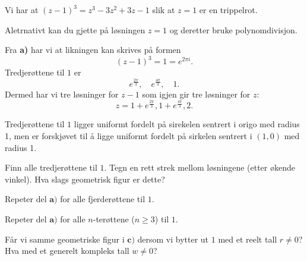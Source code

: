 \begin{losning}

\begin{punkt}
Vi har at $(z-1)^3=z^3-3z^2+3z-1$ slik at $z=1$ er en trippelrot.

\noindent
Aletrnativt kan du gjette på løsningen $z=1$ og deretter bruke polynomdivisjon.
\end{punkt}

\begin{punkt}


Fra \textbf{a)} har vi at likningen kan skrives på formen $$(z-1)^3=1=e^{2\pi i}.$$ Tredjerøttene til $1$ er $$e^{\frac{2\pi}{3}}, \quad e^{\frac{4\pi}{3}},\quad 1.$$ Dermed har vi tre løsninger for $z-1$ som igjen gir tre løsninger for $z$: $$z=1+e^{\frac{2\pi}{3}},1+e^{\frac{4\pi}{3}},2.$$

\noindent
Tredjerøttene til $1$ ligger uniformt fordelt på sirekelen sentrert i origo med radius 1, men er forskjøvet til å ligge uniformt fordelt på sirkelen sentrert i $(1,0)$ med radius 1.


\end{punkt}

\end{losning}


\begin{oppgave}

\begin{punkt}
Finn alle tredjerøttene til $1$. Tegn en rett strek mellom løsningene (etter økende vinkel). Hva slags geometrisk figur er dette?
\end{punkt}

\begin{punkt}
Repeter del $\textbf{a)}$ for alle fjerderøttene til $1$.
\end{punkt}


\begin{punkt}
Repeter del $\textbf{a)}$ for alle $n$-terøttene ($n\geq 3$) til $1$.
\end{punkt}

\begin{punkt}
Får vi samme geometriske figur i $\textbf{c)}$ dersom vi bytter ut $1$ med et reelt tall $r \neq 0$? Hva med et generelt kompleks tall $w\neq 0$?
\end{punkt}

\end{oppgave}


